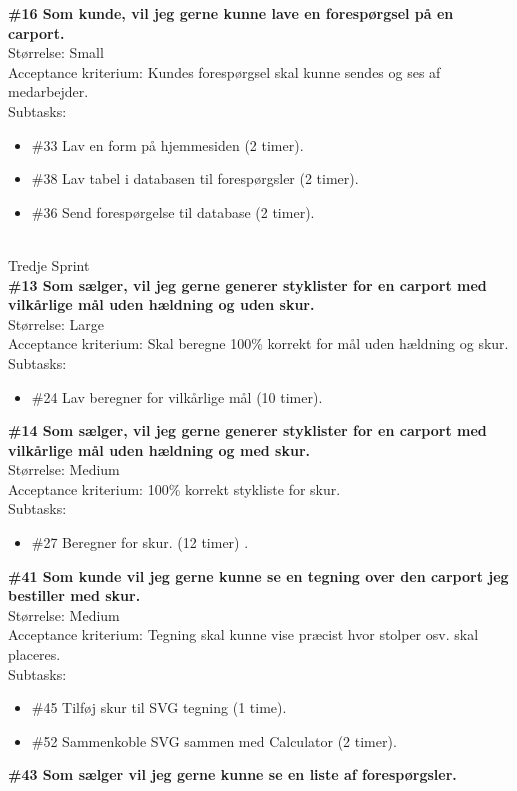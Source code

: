 \documentclass[11pt]{report}
\begin{document}
\textbf{\#16 Som kunde, vil jeg gerne kunne lave en forespørgsel på en carport. }\\
Størrelse: Small \\
Acceptance kriterium: Kundes forespørgsel skal kunne sendes og ses af medarbejder. \\
Subtasks:
\begin{itemize}
\item \#33 Lav en form på hjemmesiden (2 timer).
\item \#38 Lav tabel i databasen til forespørgsler (2 timer).
\item \#36 Send forespørgelse til database (2 timer).
\end{itemize}
\leavevmode
\\
Tredje Sprint\\
\textbf{\#13 Som sælger, vil jeg gerne generer styklister for en carport med vilkårlige mål uden hældning og uden skur. }\\
Størrelse: Large\\
Acceptance kriterium: Skal beregne 100\% korrekt for mål uden hældning og skur. \\
Subtasks:
\begin{itemize}
\item \#24 Lav beregner for vilkårlige mål (10 timer).
\end{itemize}
\textbf{\#14 Som sælger, vil jeg gerne generer styklister for en carport med vilkårlige mål uden hældning og med skur. }\\
Størrelse: Medium\\
Acceptance kriterium: 100\% korrekt stykliste for skur.\\
Subtasks:
\begin{itemize}
\item \#27 Beregner for skur. (12 timer) .
\end{itemize}
\textbf{\#41 Som kunde vil jeg gerne kunne se en tegning over den carport jeg bestiller med skur. }\\
Størrelse: Medium\\
Acceptance kriterium: Tegning skal kunne vise præcist hvor stolper osv. skal placeres.\\
Subtasks:
\begin{itemize}
\item \#45 Tilføj skur til SVG tegning (1 time).
\item \#52 Sammenkoble SVG sammen med Calculator (2 timer).
\end{itemize}
\textbf{\#43 Som sælger vil jeg gerne kunne se en liste af forespørgsler. }\\
\end{document}
